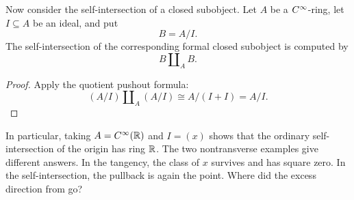 
Now consider the self-intersection of a closed subobject. Let $A$ be a
$C^\infty$-ring, let $I\subseteq A$ be an ideal, and put
\[
  B=A/I.
\]
The self-intersection of the corresponding formal closed subobject is computed
by
\[
  B\amalg_A B.
\]


\begin{proof}
  Apply the quotient pushout formula:
  \[
    (A/I)\amalg_A(A/I)
    \cong
    A/(I+I)
    =A/I.
  \]
\end{proof}

In particular, taking $A=C^\infty(\mathbb{R})$ and $I=(x)$ shows that the
ordinary self-intersection of the origin has ring $\mathbb{R}$. The two
nontransverse examples give different answers. In the tangency, the
class of $x$ survives and has square zero. In the self-intersection,
the pullback is again the point. Where did the excess direction from
 go?
